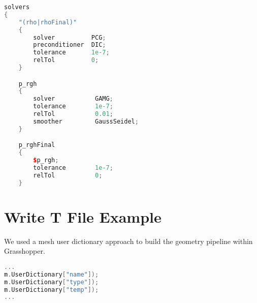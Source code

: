 \begin{theappendices}
\begin{lstlisting}[language=c++, caption=OF dictiorary in System/Brick/fvsolution]
solvers
{
    "(rho|rhoFinal)"
    {
        solver          PCG;
        preconditioner  DIC;
        tolerance       1e-7;
        relTol          0;
    }

    p_rgh
    {
        solver           GAMG;
        tolerance        1e-7;
        relTol           0.01;
        smoother         GaussSeidel;
    }

    p_rghFinal
    {
        $p_rgh;
        tolerance        1e-7;
        relTol           0;
    }

\end{lstlisting}




\singlespacing
\chapter{Write T File Example}

We used a mesh user dictionary approach to build the geometry pipeline within Grasshopper.

\begin{lstlisting}[language=c++, caption= Code to handle OF dictionary in 0/Brick/T]
...
m.UserDictionary["name"]);
m.UserDictionary["type"]);
m.UserDictionary["temp"]);
...
\end{lstlisting}







\normalsize
\singlespacing

\end{theappendices}
